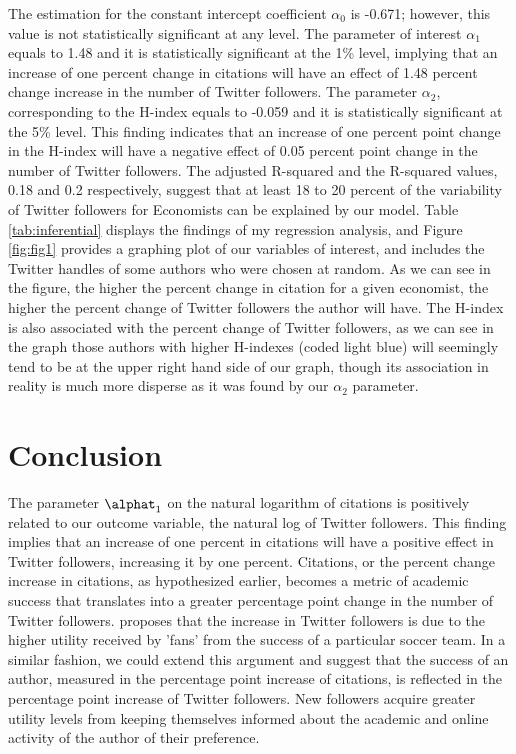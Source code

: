 \documentclass[12pt,english]{article}
\begin{document}
The estimation for the constant intercept coefficient $\alpha_{0}$ is -0.671; however, this value is not statistically significant at any level. The parameter of interest $\alpha_{1}$ equals to 1.48 and it is statistically significant at the 1\% level, implying that an increase of one percent change in citations will have an effect of 1.48 percent change increase in the number of Twitter followers. The parameter $\alpha_{2}$, corresponding to the H-index equals to -0.059 and it is statistically significant at the 5\% level. This finding indicates that an increase of one percent point change in the H-index will have a negative effect of 0.05 percent point change in the number of Twitter followers. The adjusted R-squared and the R-squared values, 0.18 and 0.2 respectively, suggest that at least 18 to 20 percent of the variability of Twitter followers for Economists can be explained by our model. Table \ref{tab:inferential} displays the findings of my regression analysis, and Figure \ref{fig:fig1} provides a graphing plot of our variables of interest, and includes the Twitter handles of some authors who were chosen at random. As we can see in the figure, the higher the percent change in citation for a given economist, the higher the percent change of Twitter followers the author will have. The H-index is also associated with the percent change of Twitter followers, as we can see in the graph those authors with higher H-indexes (coded light blue) will seemingly tend to be at the upper right hand side of our graph, though its association in reality is much more disperse as it was found by our $\alpha_{2}$ parameter. 

\section{Conclusion}\label{sec:conclusion}
The parameter $\alphat_{1}$ on the natural logarithm of citations is positively related to our outcome variable, the natural log of Twitter followers. This finding implies that an increase of one percent in citations will have a positive effect in Twitter followers, increasing it by one percent. Citations, or the percent change increase in citations, as hypothesized earlier, becomes a metric of academic success that translates into a greater percentage point change in the number of Twitter followers. \cite{levi.soccer} proposes that the increase in Twitter followers is due to the higher utility received by 'fans' from the success of a particular soccer team. In a similar fashion, we could extend this argument and suggest that the success of an author, measured in the percentage point increase of citations, is reflected in the percentage point increase of Twitter followers. New followers acquire greater utility levels from keeping themselves informed about the academic and online activity of the author of their preference.
\end{document}
